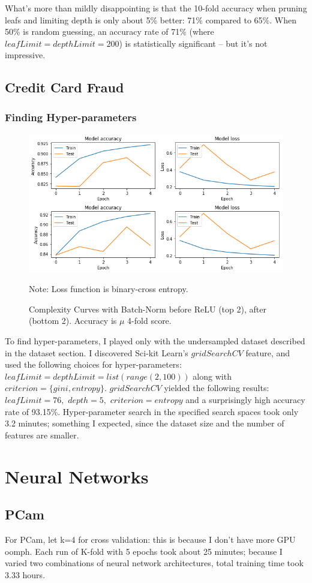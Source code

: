 \documentclass[a4paper]{article}
\begin{document}
What's more than mildly disappointing is that the 10-fold accuracy when pruning leafs and limiting depth is only about 5\% better: 71\% compared to 65\%. When 50\% is random guessing, an accuracy rate of 71\% (where $leafLimit = depthLimit = 200$) is statistically significant -- but it's not impressive.
\subsection{Credit Card Fraud}
\subsubsection{Finding Hyper-parameters}
\begin{figure}
  \centering
  \includegraphics[width=1\textwidth]{images/nnplotcam.png}
  \caption{Complexity Curves with Batch-Norm before ReLU (top 2), after (bottom 2). Accuracy is $\mu$ 4-fold score.}
  {Note: Loss function is binary-cross entropy.}
\end{figure}
To find hyper-parameters, I played only with the undersampled dataset described in the dataset section. I discovered Sci-kit Learn's $gridSearchCV$ feature, and used the following choices for hyper-parameters: $leafLimit = depthLimit = list(range(2,100))$ along with $criterion = \{ gini,  entropy \}$. $gridSearchCV$ yielded the following results: $leafLimit = 76,$ $depth = 5,$ $criterion = entropy$ and a surprisingly high accuracy rate of 93.15\%. Hyper-parameter search in the specified search spaces took only 3.2 minutes; something I expected, since the dataset size and the number of features are smaller.
\section{Neural Networks}
\subsection{PCam}
For PCam, let k=4 for cross validation: this is because I don't have more GPU oomph. Each run of K-fold with 5 epochs took about 25 minutes; because I varied two combinations of neural network architectures, total training time took 3.33 hours.
\end{document}
